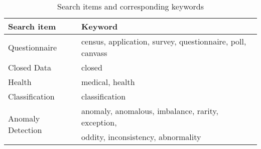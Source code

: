 \begin{table}[h!]
  \begin{center}
    \caption{Search items and corresponding keywords}
    \label{tab:table1}
    \begin{tabular}{l|l} %
      \textbf{Search item} & \textbf{Keyword}\\
      \hline
      Questionnaire & census, application, survey, questionnaire, poll, canvass\\
      \hline
      Closed Data & closed\\
      \hline
      Health & medical, health\\
      \hline
      Classification & classification\\
      \hline
      \multirow{2}{*}{Anomaly Detection} & anomaly, anomalous, imbalance, rarity, exception, \\
      & oddity, inconsistency, abnormality\\
    \end{tabular}
  \end{center}
\end{table}


